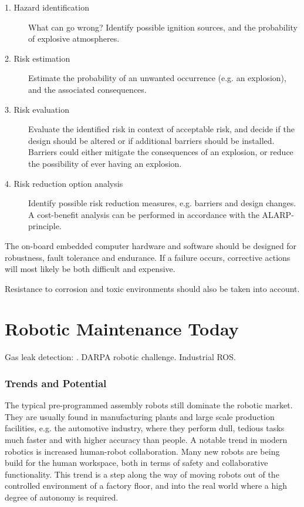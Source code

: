 \begin{description}
\item[1. Hazard identification \-] What can go wrong? Identify possible ignition sources, and the probability of explosive atmospheres.
\item[2. Risk estimation \-] Estimate the probability of an unwanted occurrence (e.g. an explosion), and the associated consequences.
\item[3. Risk evaluation \-] Evaluate the identified risk in context of acceptable risk, and decide if the design should be altered or if additional barriers should be installed. Barriers could either mitigate the consequences of an explosion, or reduce the possibility of ever having an explosion.
\item[4. Risk reduction option analysis \-] Identify possible risk reduction measures, e.g. barriers and design changes. A cost-benefit analysis can be performed in accordance with the ALARP-principle. 
\end{description}

The on-board embedded computer hardware and software should be designed for robustness, fault tolerance and endurance. If a failure occurs, corrective actions will most likely be both difficult and expensive. 

Resistance to corrosion and toxic environments should also be taken into account.

\section{Robotic Maintenance Today}

Gas leak detection: \cite{FSR2014_gas_leak}. DARPA robotic challenge. Industrial ROS.
 
\subsubsection{Trends and Potential}
 
The typical pre-programmed assembly robots still dominate the robotic market. They are usually found in manufacturing plants and large scale production facilities\cite{ifr_statistics}, e.g. the automotive industry, where they perform dull, tedious tasks much faster and with higher accuracy than people. A notable trend in modern robotics is increased human-robot collaboration\cite{cobotsEurope}. Many new robots are being build for the human workspace, both in terms of safety and collaborative functionality. This trend is a step along the way of moving robots out of the controlled environment of a factory floor, and into the real world where a high degree of autonomy is required.

